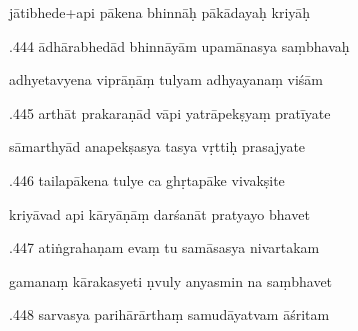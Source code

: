 \documentclass[article,12pt,a4paper]{memoir}%
\newcounter{parCount}
\begin{document}
	  
	  \pstart \leavevmode%
	jātibhede+api pākena bhinnāḥ pākādayaḥ kriyāḥ 
	{}
	\pend%
      

	  
	  \pstart {}.444 ādhārabhedād bhinnāyām upamānasya saṃbhavaḥ 
	{}
	\pend%
      

	  
	  \pstart \leavevmode%
	adhyetavyena viprāṇāṃ tulyam adhyayanaṃ viśām 
	{}
	\pend%
      

	  
	  \pstart {}.445 arthāt prakaraṇād vāpi yatrāpekṣyaṃ pratīyate 
	{}
	\pend%
      

	  
	  \pstart \leavevmode%
	sāmarthyād anapekṣasya tasya vṛttiḥ prasajyate 
	{}
	\pend%
      

	  
	  \pstart {}.446 tailapākena tulye ca ghṛtapāke vivakṣite 
	{}
	\pend%
      

	  
	  \pstart \leavevmode%
	kriyāvad api kāryāṇāṃ darśanāt pratyayo bhavet 
	{}
	\pend%
      

	  
	  \pstart {}.447 atiṅgrahaṇam evaṃ tu samāsasya nivartakam 
	{}
	\pend%
      

	  
	  \pstart \leavevmode%
	gamanaṃ kārakasyeti ṇvuly anyasmin na saṃbhavet 
	{}
	\pend%
      

	  
	  \pstart {}.448 sarvasya parihārārthaṃ samudāyatvam āśritam 
	{}
	\pend%
      
\end{document}
